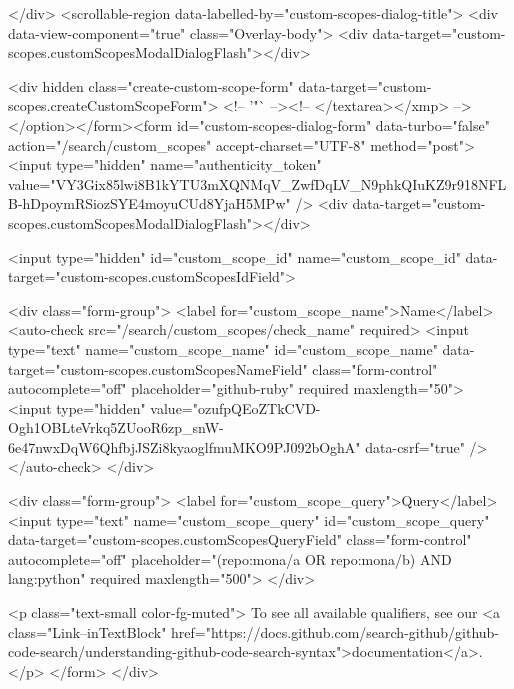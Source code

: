 {{</div>
      <scrollable-region data-labelled-by="custom-scopes-dialog-title">
        <div data-view-component="true" class="Overlay-body">        <div data-target="custom-scopes.customScopesModalDialogFlash"></div>

        <div hidden class="create-custom-scope-form" data-target="custom-scopes.createCustomScopeForm">
        <!-- '"` --><!-- </textarea></xmp> --></option></form><form id="custom-scopes-dialog-form" data-turbo="false" action="/search/custom_scopes" accept-charset="UTF-8" method="post"><input type="hidden" name="authenticity_token" value="VY3Gix85lwi8B1kYTU3mXQNMqV_ZwfDqLV_N9phkQIuKZ9r918NFLB-hDpoymRSiozSYE4moyuCUd8YjaH5MPw" />
          <div data-target="custom-scopes.customScopesModalDialogFlash"></div>

          <input type="hidden" id="custom_scope_id" name="custom_scope_id" data-target="custom-scopes.customScopesIdField">

          <div class="form-group">
            <label for="custom_scope_name">Name</label>
            <auto-check src="/search/custom_scopes/check_name" required>
              <input
                type="text"
                name="custom_scope_name"
                id="custom_scope_name"
                data-target="custom-scopes.customScopesNameField"
                class="form-control"
                autocomplete="off"
                placeholder="github-ruby"
                required
                maxlength="50">
              <input type="hidden" value="ozufpQEoZTkCVD-Ogh1OBLteVrkq5ZUooR6zp_snW-6e47nwxDqW6QhfbjJSZi8kyaoglfmuMKO9PJ092bOghA" data-csrf="true" />
            </auto-check>
          </div>

          <div class="form-group">
            <label for="custom_scope_query">Query</label>
            <input
              type="text"
              name="custom_scope_query"
              id="custom_scope_query"
              data-target="custom-scopes.customScopesQueryField"
              class="form-control"
              autocomplete="off"
              placeholder="(repo:mona/a OR repo:mona/b) AND lang:python"
              required
              maxlength="500">
          </div>

          <p class="text-small color-fg-muted">
            To see all available qualifiers, see our <a class="Link--inTextBlock" href="https://docs.github.com/search-github/github-code-search/understanding-github-code-search-syntax">documentation</a>.
          </p>
</form>        </div>

}}
